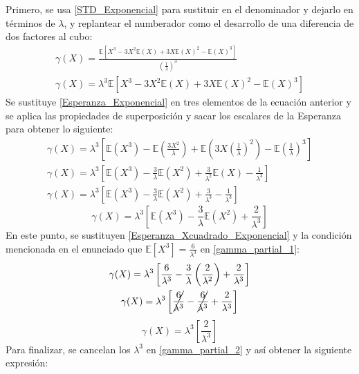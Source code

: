 \documentclass[spanish]{article}
\begin{document}
\begin{enumerate}
Primero, se usa \ref{STD_Exponencial} para sustituir en el denominador y dejarlo en t\'{e}rminos de $\lambda$, y replantear el numberador como el desarrollo de una diferencia de dos factores al cubo:
\begin{gather*}
    \gamma(X) =\frac{\mathbb{E}\left[X^3-3X^2\mathbb{E}(X)+3X\mathbb{E}(X)^2-\mathbb{E}(X)^3\right]}{(\frac{1}{\lambda})^{3}}\\
    \gamma(X) =\lambda^{3}\mathbb{E}\left[X^3-3X^2\mathbb{E}(X)+3X\mathbb{E}(X)^2-\mathbb{E}(X)^3\right]
\end{gather*}
Se sustituye \ref{Esperanza_Exponencial} en tres elementos de la ecuaci\'{o}n anterior y se aplica las propiedades de superposici\'{o}n y sacar los escalares de la Esperanza para obtener lo siguiente:
\begin{gather*}
    \gamma(X) =\lambda^{3}\left[\mathbb{E}(X^3)-\mathbb{E}\left(\frac{3X^2}{\lambda}\right)+\mathbb{E}\left(3X\left(\frac{1}{\lambda}\right)^2\right)-\mathbb{E}\left(\frac{1}{\lambda}\right)^3\right]\\
    \gamma(X) =\lambda^{3}\left[\mathbb{E}(X^3)-\frac{3}{\lambda}\mathbb{E}(X^2)+\frac{3}{\lambda^2}\mathbb{E}(X)-\frac{1}{\lambda^3}\right]\\
    \gamma(X) =\lambda^{3}\left[\mathbb{E}(X^3)-\frac{3}{\lambda}\mathbb{E}(X^2)+\frac{3}{\lambda^3}-\frac{1}{\lambda^3}\right]
\end{gather*}
\begin{equation} \label{gamma_partial_1}
    \gamma(X) =\lambda^{3}\left[\mathbb{E}(X^3)-\frac{3}{\lambda}\mathbb{E}(X^2)+\frac{2}{\lambda^3}\right]
\end{equation}
En este punto, se sustituyen \ref{Esperanza_Xcuadrado_Exponencial} y la condici\'{o}n mencionada en el enunciado que $\mathbb{E}\left[X^{3}\right]=\frac{6}{\lambda^{3}}$ en \ref{gamma_partial_1}:
\begin{gather*}
    \gamma(X) =\lambda^{3}\left[\frac{6}{\lambda^3}-\frac{3}{\lambda}\left(\frac{2}{\lambda^2}\right)+\frac{2}{\lambda^3}\right]\\
    \gamma(X) =\lambda^{3}\left[\cancel{\frac{6}{\lambda^3}}-\cancel{\frac{6}{\lambda^3}}+\frac{2}{\lambda^3}\right]
\end{gather*}
\begin{equation} \label{gamma_partial_2}
    \gamma(X) =\lambda^{3}\left[\frac{2}{\lambda^3}\right]
\end{equation}
Para finalizar, se cancelan los $\lambda^3$ en \ref{gamma_partial_2} y as\'{i} obtener la siguiente expresi\'{o}n:
\begin{gather*}

\end{gather*}
\end{enumerate}
\end{document}
